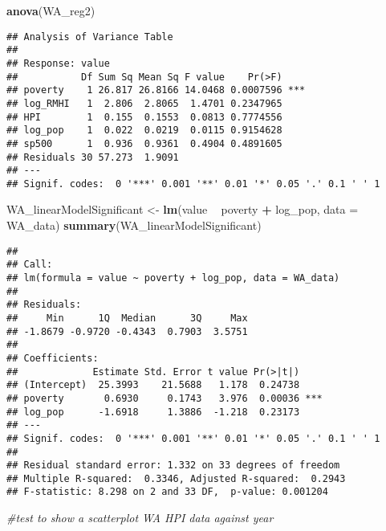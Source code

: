 \documentclass[
]{article}
\newenvironment{Shaded}{\begin{snugshade}}{\end{snugshade}}
\newcommand{\CommentTok}[1]{\textcolor[rgb]{0.56,0.35,0.01}{\textit{#1}}}
\newcommand{\DataTypeTok}[1]{\textcolor[rgb]{0.13,0.29,0.53}{#1}}
\newcommand{\KeywordTok}[1]{\textcolor[rgb]{0.13,0.29,0.53}{\textbf{#1}}}
\newcommand{\NormalTok}[1]{#1}
\newcommand{\OperatorTok}[1]{\textcolor[rgb]{0.81,0.36,0.00}{\textbf{#1}}}
\newcommand{\StringTok}[1]{\textcolor[rgb]{0.31,0.60,0.02}{#1}}
\begin{document}
\begin{Shaded}
\begin{Highlighting}[]
\KeywordTok{anova}\NormalTok{(WA_reg2)}
\end{Highlighting}
\end{Shaded}

\begin{verbatim}
## Analysis of Variance Table
## 
## Response: value
##           Df Sum Sq Mean Sq F value    Pr(>F)    
## poverty    1 26.817 26.8166 14.0468 0.0007596 ***
## log_RMHI   1  2.806  2.8065  1.4701 0.2347965    
## HPI        1  0.155  0.1553  0.0813 0.7774556    
## log_pop    1  0.022  0.0219  0.0115 0.9154628    
## sp500      1  0.936  0.9361  0.4904 0.4891605    
## Residuals 30 57.273  1.9091                      
## ---
## Signif. codes:  0 '***' 0.001 '**' 0.01 '*' 0.05 '.' 0.1 ' ' 1
\end{verbatim}

\begin{Shaded}
\begin{Highlighting}[]
\NormalTok{WA_linearModelSignificant <-}\StringTok{ }\KeywordTok{lm}\NormalTok{(value }\OperatorTok{~}\StringTok{ }\NormalTok{poverty }\OperatorTok{+}\StringTok{ }\NormalTok{log_pop, }\DataTypeTok{data =}\NormalTok{ WA_data)}
\KeywordTok{summary}\NormalTok{(WA_linearModelSignificant)}
\end{Highlighting}
\end{Shaded}

\begin{verbatim}
## 
## Call:
## lm(formula = value ~ poverty + log_pop, data = WA_data)
## 
## Residuals:
##     Min      1Q  Median      3Q     Max 
## -1.8679 -0.9720 -0.4343  0.7903  3.5751 
## 
## Coefficients:
##             Estimate Std. Error t value Pr(>|t|)    
## (Intercept)  25.3993    21.5688   1.178  0.24738    
## poverty       0.6930     0.1743   3.976  0.00036 ***
## log_pop      -1.6918     1.3886  -1.218  0.23173    
## ---
## Signif. codes:  0 '***' 0.001 '**' 0.01 '*' 0.05 '.' 0.1 ' ' 1
## 
## Residual standard error: 1.332 on 33 degrees of freedom
## Multiple R-squared:  0.3346, Adjusted R-squared:  0.2943 
## F-statistic: 8.298 on 2 and 33 DF,  p-value: 0.001204
\end{verbatim}

\begin{Shaded}
\begin{Highlighting}[]
\CommentTok{#test to show a scatterplot WA HPI data against year}
\end{Highlighting}
\end{Shaded}
\end{document}

